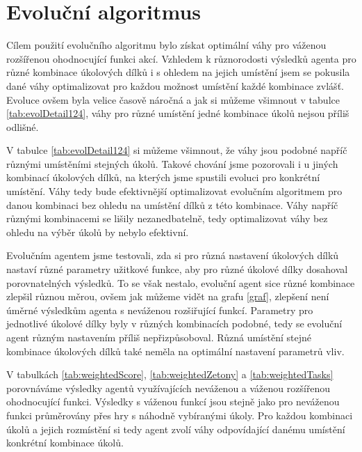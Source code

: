 \tableSettingsDetailWorst
\tableSettingsDetailBest

\section{Evoluční algoritmus}

Cílem použití evolučního algoritmu bylo získat optimální váhy pro váženou rozšířenou ohodnocující funkci akcí. Vzhledem k různorodosti výsledků agenta pro různé kombinace úkolových dílků i s ohledem na jejich umístění jsem se pokusila dané váhy optimalizovat pro každou možnost umístění každé kombinace zvlášť. Evoluce ovšem byla velice časově náročná a jak si můžeme všimnout v tabulce \ref{tab:evolDetail124}, váhy pro různé umístění jedné kombinace úkolů nejsou příliš odlišné.

\tableEvolDetail

V tabulce \ref{tab:evolDetail124} si můžeme všimnout, že váhy jsou podobné napříč různými umístěními stejných úkolů. Takové chování jsme pozorovali i u jiných kombinací úkolových dílků, na kterých jsme spustili evoluci pro konkrétní umístění. Váhy tedy bude efektivnější optimalizovat evolučním algoritmem pro danou kombinaci bez ohledu na umístění dílků z této kombinace. Váhy napříč různými kombinacemi se lišily nezanedbatelně, tedy optimalizovat váhy bez ohledu na výběr úkolů by nebylo efektivní.

\tableEvolScore

Evolučním agentem jsme testovali, zda si pro různá nastavení úkolových dílků nastaví různé parametry užitkové funkce, aby pro různé úkolové dílky dosahoval porovnatelných výsledků. To se však nestalo, evoluční agent sice různé kombinace zlepšil různou měrou, ovšem jak můžeme vidět na grafu \ref{graf}, zlepšení není úměrné výsledkům agenta s neváženou rozšiřující funkcí. Parametry pro jednotlivé úkolové dílky byly v různých kombinacích podobné, tedy se evoluční agent různým nastavením příliš nepřizpůsoboval. Různá umístění stejné kombinace úkolových dílků také neměla na optimální nastavení parametrů vliv.

\plotPokus

V tabulkách \ref{tab:weightedScore}, \ref{tab:weightedZetony} a \ref{tab:weightedTasks} porovnáváme výsledky agentů využívajících neváženou a váženou rozšířenou ohodnocující funkci. Výsledky s váženou funkcí jsou stejně jako pro neváženou funkci průměrovány přes hry s náhodně vybíranými úkoly. Pro každou kombinaci úkolů a jejich rozmístění si tedy agent zvolí váhy odpovídající danému umístění konkrétní kombinace úkolů.

